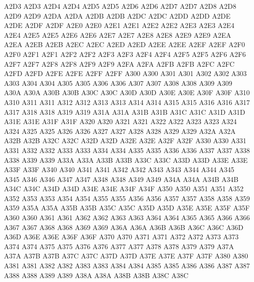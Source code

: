 \ID A2D3 A2D3
\ID A2D4 A2D4
\ID A2D5 A2D5
\ID A2D6 A2D6
\ID A2D7 A2D7
\ID A2D8 A2D8
\ID A2D9 A2D9
\ID A2DA A2DA
\ID A2DB A2DB
\ID A2DC A2DC
\ID A2DD A2DD
\ID A2DE A2DE
\ID A2DF A2DF
\ID A2E0 A2E0
\ID A2E1 A2E1
\ID A2E2 A2E2
\ID A2E3 A2E3
\ID A2E4 A2E4
\ID A2E5 A2E5
\ID A2E6 A2E6
\ID A2E7 A2E7
\ID A2E8 A2E8
\ID A2E9 A2E9
\ID A2EA A2EA
\ID A2EB A2EB
\ID A2EC A2EC
\ID A2ED A2ED
\ID A2EE A2EE
\ID A2EF A2EF
\ID A2F0 A2F0
\ID A2F1 A2F1
\ID A2F2 A2F2
\ID A2F3 A2F3
\ID A2F4 A2F4
\ID A2F5 A2F5
\ID A2F6 A2F6
\ID A2F7 A2F7
\ID A2F8 A2F8
\ID A2F9 A2F9
\ID A2FA A2FA
\ID A2FB A2FB
\ID A2FC A2FC
\ID A2FD A2FD
\ID A2FE A2FE
\ID A2FF A2FF
\ID A300 A300
\ID A301 A301
\ID A302 A302
\ID A303 A303
\ID A304 A304
\ID A305 A305
\ID A306 A306
\ID A307 A307
\ID A308 A308
\ID A309 A309
\ID A30A A30A
\ID A30B A30B
\ID A30C A30C
\ID A30D A30D
\ID A30E A30E
\ID A30F A30F
\ID A310 A310
\ID A311 A311
\ID A312 A312
\ID A313 A313
\ID A314 A314
\ID A315 A315
\ID A316 A316
\ID A317 A317
\ID A318 A318
\ID A319 A319
\ID A31A A31A
\ID A31B A31B
\ID A31C A31C
\ID A31D A31D
\ID A31E A31E
\ID A31F A31F
\ID A320 A320
\ID A321 A321
\ID A322 A322
\ID A323 A323
\ID A324 A324
\ID A325 A325
\ID A326 A326
\ID A327 A327
\ID A328 A328
\ID A329 A329
\ID A32A A32A
\ID A32B A32B
\ID A32C A32C
\ID A32D A32D
\ID A32E A32E
\ID A32F A32F
\ID A330 A330
\ID A331 A331
\ID A332 A332
\ID A333 A333
\ID A334 A334
\ID A335 A335
\ID A336 A336
\ID A337 A337
\ID A338 A338
\ID A339 A339
\ID A33A A33A
\ID A33B A33B
\ID A33C A33C
\ID A33D A33D
\ID A33E A33E
\ID A33F A33F
\ID A340 A340
\ID A341 A341
\ID A342 A342
\ID A343 A343
\ID A344 A344
\ID A345 A345
\ID A346 A346
\ID A347 A347
\ID A348 A348
\ID A349 A349
\ID A34A A34A
\ID A34B A34B
\ID A34C A34C
\ID A34D A34D
\ID A34E A34E
\ID A34F A34F
\ID A350 A350
\ID A351 A351
\ID A352 A352
\ID A353 A353
\ID A354 A354
\ID A355 A355
\ID A356 A356
\ID A357 A357
\ID A358 A358
\ID A359 A359
\ID A35A A35A
\ID A35B A35B
\ID A35C A35C
\ID A35D A35D
\ID A35E A35E
\ID A35F A35F
\ID A360 A360
\ID A361 A361
\ID A362 A362
\ID A363 A363
\ID A364 A364
\ID A365 A365
\ID A366 A366
\ID A367 A367
\ID A368 A368
\ID A369 A369
\ID A36A A36A
\ID A36B A36B
\ID A36C A36C
\ID A36D A36D
\ID A36E A36E
\ID A36F A36F
\ID A370 A370
\ID A371 A371
\ID A372 A372
\ID A373 A373
\ID A374 A374
\ID A375 A375
\ID A376 A376
\ID A377 A377
\ID A378 A378
\ID A379 A379
\ID A37A A37A
\ID A37B A37B
\ID A37C A37C
\ID A37D A37D
\ID A37E A37E
\ID A37F A37F
\ID A380 A380
\ID A381 A381
\ID A382 A382
\ID A383 A383
\ID A384 A384
\ID A385 A385
\ID A386 A386
\ID A387 A387
\ID A388 A388
\ID A389 A389
\ID A38A A38A
\ID A38B A38B
\ID A38C A38C
